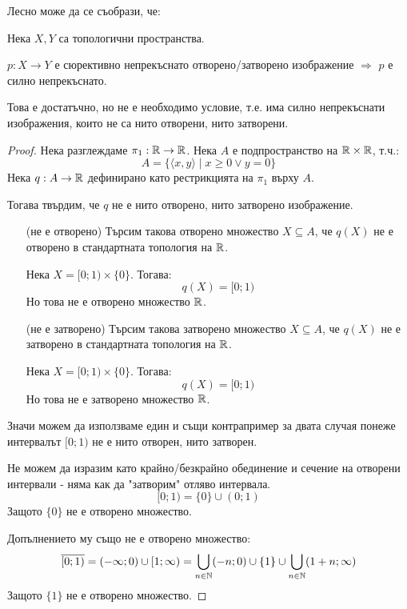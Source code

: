 Лесно може да се съобрази, че:
\begin{proposition}
    Нека $X, Y$ са топологични пространства.

    $p: X \to Y$ е сюрективно непрекъснато отворено/затворено изображение $\Rightarrow$ $p$ е силно непрекъснато.
\end{proposition}
\begin{remark}
    Това е достатъчно, но не е необходимо условие, т.е. има силно непрекъснати изображения, които не са нито отворени, нито затворени.
\end{remark}
\begin{proof}
    Нека разглеждаме $\pi_1: {\mathbb{R}} \to {\mathbb{R}}$. Нека $A$ е подпространство на ${\mathbb{R}} \times {\mathbb{R}}$, т.ч.:
    \begin{equation}
        A = \{\langle x, y \rangle \mid x \geq 0 \lor y=0\}
    \end{equation}
    Нека $q : A \to {\mathbb{R}}$ дефинирано като рестрикцията на $\pi_1$ върху $A$.

    Тогава твърдим, че $q$ не е нито отворено, нито затворено изображение.

    \begin{itemize}
        \item[(не е отворено)] Търсим такова отворено множество $X \subseteq A$, че $q(X)$ не е отворено в стандартната топология на ${\mathbb{R}}$.
        
        Нека $X = [0; 1) \times \{0\}$. Тогава:
        \begin{equation}
            q(X) = [0; 1)
        \end{equation}
        Но това не е отворено множество ${\mathbb{R}}$.

        \item[(не е затворено)] Търсим такова затворено множество $X \subseteq A$, че $q(X)$ не е затворено в стандартната топология на ${\mathbb{R}}$.
        
        Нека $X = [0; 1) \times \{0\}$. Тогава:
        \begin{equation}
            q(X) = [0; 1)
        \end{equation}
        Но това не е затворено множество ${\mathbb{R}}$.
    \end{itemize}
    Значи можем да използваме един и същи контрапример за двата случая понеже интервалът $[0; 1)$ не е нито отворен, нито затворен.

    Не можем да изразим като крайно/безкрайно обединение и сечение на отворени интервали - няма как да "затворим" отляво интервала.
    \begin{equation}
        [0; 1) = \{0\} \cup (0; 1)
    \end{equation}
    Защото $\{0\}$ не е отворено множество.

    Допълнението му също не е отворено множество:
    \begin{equation}
        \overline{[0; 1)} = (-\infty; 0) \cup [1; \infty) = \bigcup_{n \in {\mathbb{N}}} (-n;0) \cup \{1\} \cup \bigcup_{n\in{\mathbb{N}}} (1+n;\infty)
    \end{equation}
    Защото $\{1\}$ не е отворено множество.
\end{proof}

